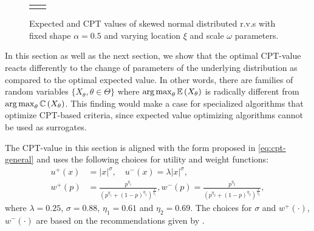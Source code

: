 \begin{figure}
\begin{minipage}{.6\textwidth}
\begin{tabular}{cc}
{{   }
   }
   \end{tabular}
\caption{Expected and CPT values of skewed normal distributed r.v.s with fixed shape $\alpha=0.5$ and varying location $\xi$ and scale $\omega$ parameters\protect\footnotemark[1]. }
\label{fig:skewnormal}
\end{minipage}

\end{figure}

In this section as well as the next section, we show that the optimal CPT-value reacts differently to the change of parameters of the underlying distribution as compared to the optimal expected value. In other words,  there are families of random variables $\{X_\theta, \theta \in \Theta\}$ where $\mathop{\rm arg\,max}_{\theta} \mathbb{E}\left( X_\theta \right)$ is radically different from 
$\mathop{\rm arg\,max}_{\theta} \mathbb{C} \left( X_\theta \right)$. This finding would make a case for specialized algorithms that optimize CPT-based criteria, since expected value optimizing algorithms cannot be used as surrogates. 

The CPT-value in this section is aligned with the form proposed in \eqref{eq:cpt-general} and uses the following choices for utility and weight functions:
\begin{align*}
u^+(x) &=  |x|^{\sigma}, \quad u^-(x) = \lambda |x|^{\sigma},\\
w^+(p) &= \frac{p^{\eta_1}}{{(p^{\eta_1}+ (1-p)^{\eta_1})}^{\frac{1}{\eta_1}}}, w^-(p) = \frac{p^{\eta_2}}{{(p^{\eta_2}+ (1-p)^{\eta_2})}^{\frac{1}{\eta_2}}},
\end{align*} 
where $\lambda = 0.25$, $\sigma = 0.88$, $\eta_1 = 0.61$ and $\eta_2 = 0.69$. The choices for $\sigma$ and $w^+(\cdot)$,  $w^-(\cdot)$ are based on the recommendations given by \cite{tversky1992advances}. 


